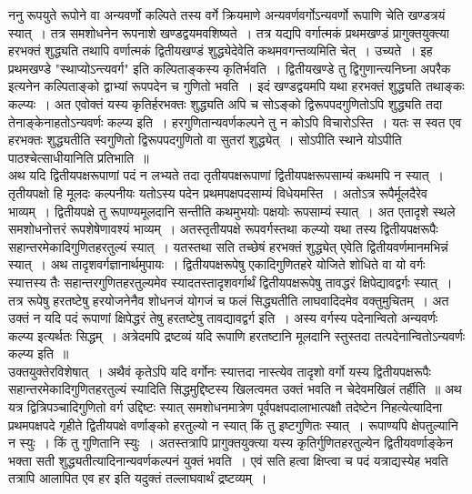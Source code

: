 \documentclass[11pt, openany]{book}
\begin{document}
\vspace{-3mm}
 ननु रूपयुते रूपोने वा अन्यवर्णो कल्पिते तस्य वर्गे क्रियमाणे 
अन्यवर्णवर्गोऽन्यवर्णो रूपाणि चेति खण्डत्रयं स्यात्~। तत्र समशोधनेन
रूपनाशे खण्डद्वयमवशिष्यते~। तत्र यद्यपि वर्गात्मकं प्रथमखण्डं प्रागुक्तयुक्त्या हरभक्तं शुद्ध्यति तथापि वर्णात्मकं द्वितीयखण्डं शुद्ध्येदेवेति
कथमवगन्तव्यमिति चेत्~। उच्यते~। इह प्रथमखण्डे {\qt "स्थाप्योऽन्त्यवर्ग"}
इति कल्पिताङ्कस्य कृतिर्भवति~। द्वितीयखण्डे तु द्विगुणान्त्यनिघ्ना अपरैक
इत्यनेन कल्पिताङ्को द्वाभ्यां रूपपदेन च गुणितो भवति~। इदं खण्डद्वयमपि
\newpage
\noindent यथा हरभक्तं शुद्ध्यति तथाङ्कः कल्प्यः~। अत एवोक्तं यस्य कृतिर्हरभक्तः शुद्ध्यति अपि च सोऽङ्को द्विरूपपदगुणितोऽपि शुद्ध्यति तदा 
तेनाङ्केनाहतोऽन्यवर्णः कल्प्य इति~। हरगुणितान्यवर्णकल्पने तु न कोऽपि 
विचारोऽस्ति~। यतः स स्वत एव हरभक्तः शुद्ध्यतीति स्वगुणितो 
द्विरूपपदगुणितो वा सुतरां शुद्ध्येत्~। सोऽपीति स्थाने योऽपीति 
पाठश्चेत्साधीयानिति प्रतिभाति~॥ \\

\vspace{-3mm}
 अथ यदि द्वितीयपक्षरूपाणां पदं न लभ्यते तदा तृतीयपक्षरूपाणां 
द्वितीयपक्षरूपसाम्यं कथमपि न स्यात्~। तृतीयपक्षो हि मूलदः कल्पनीयः 
यतोऽस्य पदेन प्रथमपक्षपदसाम्यं विधेयमस्ति~। अतोऽत्र रूपैर्मूलदैरेव 
भाव्यम्~। द्वितीयपक्षे तु रूपाण्यमूलदानि सन्तीति कथमुभयोः पक्षयोः 
रूपसाम्यं स्यात्~। अत एतादृशे स्थले समशोधनोत्तरं रूपशेषेणावश्यं 
भाव्यम्~। अतस्तृतीयपक्षे रूपवर्गस्तथा कल्प्यो यथा तस्य द्वितीयपक्षरूपैः
सहान्तरमेकादिगुणितहरतुल्यं स्यात्~। यतस्तथा सति तच्छेषं हरभक्तं 
शुद्ध्येत् एवेति द्वितीयवर्णमानमभिन्नं स्यात्~। अथ तादृशवर्गज्ञानार्थमुपायः~। 
द्वितीयपक्षरूपेषु एकादिगुणितहरे योजिते शोधिते वा यो वर्गः स्यात्तस्य 
तैः सहान्तरगुणितहरतुल्यमेव स्यादतस्तादृशवर्गार्थं द्वितीयपक्षरूपेषु तावद्धरं 
क्षिपेद्यावद्वर्गः स्यात्~। तत्र रूपेषु हरतष्टेषु हरयोजनेनैव शोधनजं योगजं 
च फलं सिद्ध्यतीति लाघवादिदमेव वक्तुमुचितम्~। अत उक्तं न यदि 
पदं रूपाणां क्षिपेद्धरं तेषु हरतष्टेषु तावद्यावद्वर्ग इति~। अस्य वर्गस्य
पदेनान्वितो अन्यवर्णः कल्प्य इत्यर्थतः सिद्धम्~। अत्रेदमपि द्रष्टव्यं 
यदि रूपाणि हरतष्टानि मूलदानि स्तुस्तदा तत्पदेनान्वितोऽन्यवर्णः 
कल्प्य इति~॥ \\

\vspace{-3mm}
 उक्तयुक्तेरविशेषात्~। अथैवं कृतेऽपि यदि वर्गोनः स्यात्तदा नास्त्येव 
तादृशो वर्गो यस्य द्वितीयपक्षरूपैः सहान्तरमेकादिगुणितहरतुल्यं स्यादिति
सिद्धमुद्दिष्टस्य खिलत्वमत उक्तं भवति न चेदेवमखिलं तर्हीति~॥
\newpage
 अथ यत्र द्वित्रिपञ्चादिगुणितो वर्ग उद्दिष्टः स्यात् समशोधनमात्रेण 
पूर्वपक्षपदालाभात्पक्षौ तदेष्टेन निहत्येत्यादिना प्रथमपक्षपदे गृहीते द्वितीयपक्षे 
वर्णाङ्को हरतुल्यो न स्यात् किं तु इष्टगुणितः स्यात्~। रूपाण्यपि 
क्षेपतुल्यानि न स्युः~। किं तु गुणितानि स्युः~। अतस्तत्रापि प्रागुक्तयुक्त्या 
यस्य कृतिर्गुणितहरतुल्येन द्वितीयवर्णाङ्केन भक्ता सती
शुद्ध्यतीत्यादिनान्यवर्णकल्पनं युक्तं भवति~। एवं सति हत्वा क्षिप्त्वा च पदं यत्राद्यस्येह भवति तत्रापि आलापित एव हर इति यदुक्तं तल्लाघवार्थं द्रष्टव्यम्~। \\
\end{document}

